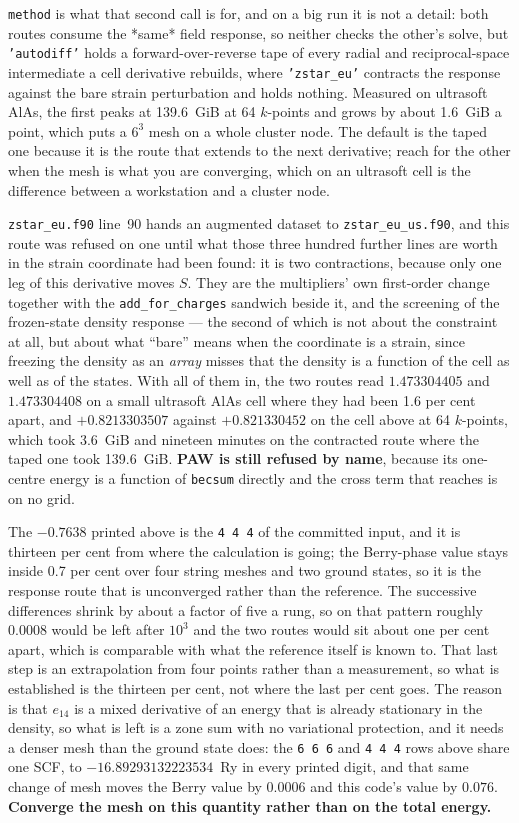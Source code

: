 \documentclass[11pt,a4paper]{article}
\newcommand{\code}[1]{\texttt{\small #1}}
\begin{document}
\code{method} is what that second call is for, and on a big run it is not a
detail: both routes consume the *same* field response, so neither checks the
other's solve, but \code{'autodiff'} holds a forward-over-reverse tape of every
radial and reciprocal-space intermediate a cell derivative rebuilds, where
\code{'zstar\_eu'} contracts the response against the bare strain perturbation
and holds nothing. Measured on ultrasoft AlAs, the first peaks at 139.6~GiB at
64 $k$-points and grows by about 1.6~GiB a point, which puts a $6^3$ mesh on a
whole cluster node. The default is the taped one because it is the route that
extends to the next derivative; reach for the other when the mesh is what you
are converging, which on an ultrasoft cell is the difference between a
workstation and a cluster node.

\code{zstar\_eu.f90} line~90 hands an augmented dataset to
\code{zstar\_eu\_us.f90}, and this route was refused on one until what those
three hundred further lines are worth in the strain coordinate had been found:
it is two contractions, because only one leg of this derivative moves $S$. They
are the multipliers' own first-order change together with the
\code{add\_for\_charges} sandwich beside it, and the screening of the
frozen-state density response --- the second of which is not about the
constraint at all, but about what ``bare'' means when the coordinate is a
strain, since freezing the density as an \emph{array} misses that the density
is a function of the cell as well as of the states. With all of them in, the
two routes read $1.473304405$ and $1.473304408$ on a small ultrasoft AlAs cell
where they had been 1.6 per cent apart, and $+0.8213303507$ against
$+0.821330452$ on the cell above at 64 $k$-points, which took 3.6~GiB and
nineteen minutes on the contracted route where the taped one took 139.6~GiB.
\textbf{PAW is still refused by name}, because its one-centre energy is a
function of \code{becsum} directly and the cross term that reaches is on no
grid.

The $-0.7638$ printed above is the \code{4 4 4} of the committed input, and it
is thirteen per cent from where the calculation is going; the Berry-phase value
stays inside 0.7 per cent over four string meshes and two ground states, so it
is the response route that is unconverged rather than the reference. The
successive differences shrink by about a factor of five a rung, so on that
pattern roughly $0.0008$ would be left after $10^3$ and the two routes
would sit about one per cent apart, which is comparable with what the reference
itself is known to. That last step is an extrapolation from four points rather
than a measurement, so what is established is the thirteen per cent, not where
the last per cent goes. The reason
is that $e_{14}$ is a mixed derivative of an energy that is already stationary
in the density, so what is left is a zone sum with no variational protection,
and it needs a denser mesh than the ground state does: the \code{6 6 6} and
\code{4 4 4} rows above share one SCF, to $-16.89293132223534$~Ry in every
printed digit, and that same change of mesh moves the Berry value by $0.0006$
and this code's value by $0.076$. \textbf{Converge the mesh on this quantity
rather than on the total energy.}
\end{document}
